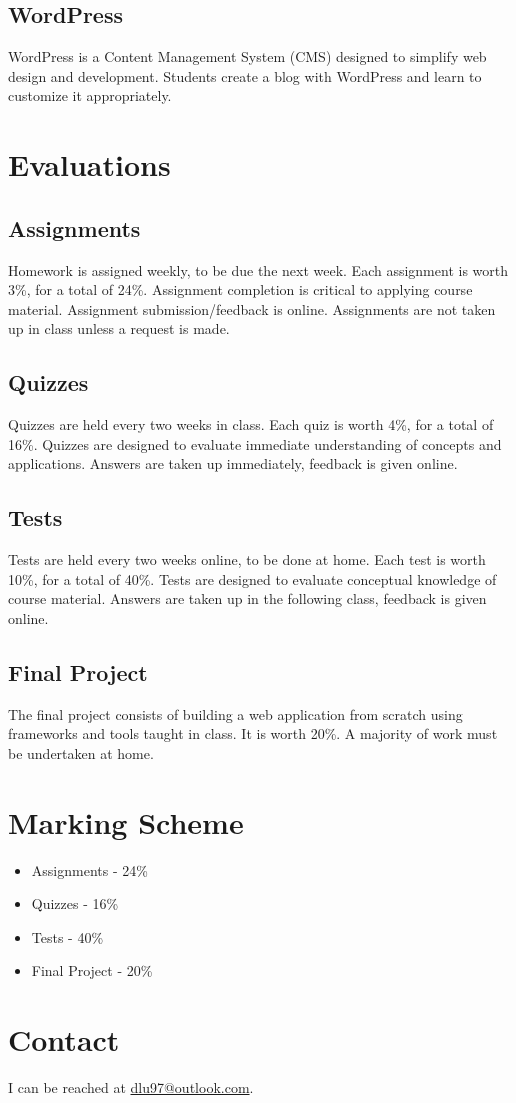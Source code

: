\documentclass{article}
\begin{document}
	\subsection{WordPress}

	WordPress is a Content Management System (CMS) designed to simplify web design and development. Students create a blog with WordPress and learn to customize it appropriately.

	\section{Evaluations}
	
	\subsection{Assignments}
	Homework is assigned weekly, to be due the next week. Each assignment is worth 3\%, for a total of 24\%. Assignment completion is critical to applying course material. Assignment submission/feedback is online. Assignments are not taken up in class unless a request is made. 
	
	\subsection{Quizzes}
	Quizzes are held every two weeks in class. Each quiz is worth 4\%, for a total of 16\%. Quizzes are designed to evaluate immediate understanding of concepts and applications. Answers are taken up immediately, feedback is given online.
	
	\subsection{Tests}
	Tests are held every two weeks online, to be done at home. Each test is worth 10\%, for a total of 40\%. Tests are designed to evaluate conceptual knowledge of course material. Answers are taken up in the following class, feedback is given online.
	
	\subsection{Final Project}
	The final project consists of building a web application from scratch using frameworks and tools taught in class. It is worth 20\%. A majority of work must be undertaken at home.
	
	\section{Marking Scheme}
	
	\begin{itemize}
		\item{Assignments - 24\%}
		\item{Quizzes - 16\%}
		\item{Tests - 40\%}
		\item{Final Project - 20\%}
	\end{itemize}
	
	\section{Contact}
	
	I can be reached at \href{mailto:dlu97@outlook.com}{dlu97@outlook.com}. 
	
\end{document}

